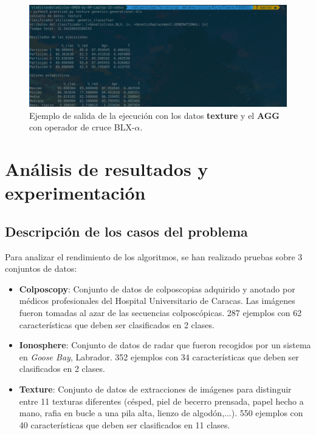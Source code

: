 \documentclass[11pt,a4paper]{article}
\begin{document}
\begin{figure}[H]
\centering
\includegraphics[scale=0.4]{img/out_example.png}
\caption{Ejemplo de salida de la ejecución con los datos \textbf{texture} y el \textbf{AGG}
con operador de cruce BLX-$\alpha$.}
\end{figure}

\newpage

\section{Análisis de resultados y experimentación}

\subsection{Descripción de los casos del problema}

Para analizar el rendimiento de los algoritmos, se han realizado pruebas sobre 3 conjuntos de datos:

\begin{itemize}[label=\textbullet]
	\item \textbf{Colposcopy}: Conjunto de datos de colposcopias adquirido y anotado por médicos profesionales del Hospital
	Universitario de Caracas. Las imágenes fueron tomadas al azar de las secuencias colposcópicas. 287 ejemplos con 62
	características que deben ser clasificados en 2 clases.
	\item \textbf{Ionosphere}: Conjunto de datos de radar que fueron recogidos por un sistema en \textit{Goose Bay},
	Labrador. 352 ejemplos con 34 características que deben ser clasificados en 2 clases.
	\item \textbf{Texture}: Conjunto de datos de extracciones de imágenes para distinguir entre 11 texturas diferentes
	(césped, piel de becerro prensada, papel hecho a mano, rafia en bucle a una pila alta, lienzo de algodón,...). 550
	ejemplos con 40 características que deben ser clasificados en 11 clases.
\end{itemize}
\end{document}
